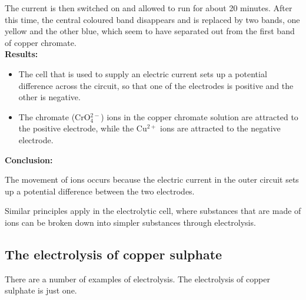 {The current is then switched on and allowed to run for about 20 minutes. After this time, the central coloured band disappears and is replaced by two bands, one yellow and the other blue, which seem to have separated out from the first band of copper chromate. \\

\textbf{Results:} 

\begin{itemize}
\item{The cell that is used to supply an electric current sets up a potential difference across the circuit, so that one of the electrodes is positive and the other is negative.}
\item{The chromate (CrO$_{4}^{2-}$) ions in the copper chromate solution are attracted to the positive electrode, while the Cu$^{2+}$ ions are attracted to the negative electrode.}
\end{itemize}

\textbf{Conclusion:\\}

The movement of ions occurs because the electric current in the outer circuit sets up a potential difference between the two electrodes.
}

Similar principles apply in the electrolytic cell, where substances that are made of ions can be broken down into simpler substances through electrolysis.
\clearpage
\subsection{The electrolysis of copper sulphate}
There are a number of examples of electrolysis. The electrolysis of copper sulphate is just one.

